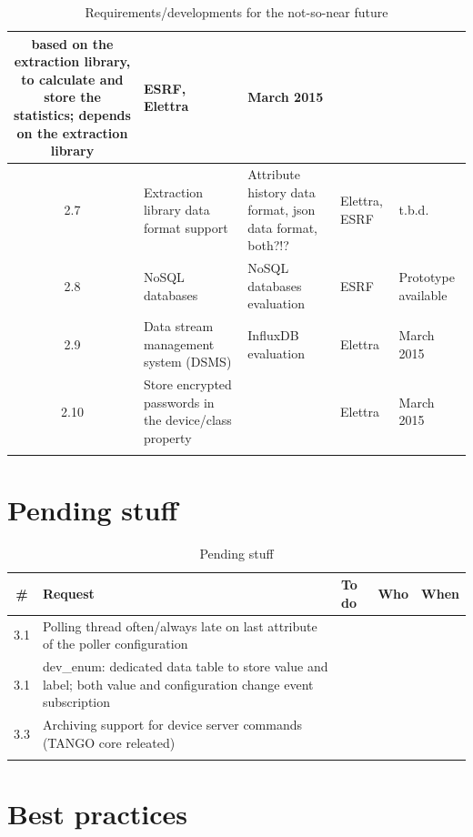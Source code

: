 \documentclass[11pt,a4paper]{article}
\begin{document}
\begin{longtable}{|c|p{6.0cm}|p{6.0cm}|p{1.0cm}|p{1.4cm}|}
	based on the extraction library, to calculate and store the
	statistics; depends on the extraction library &
	ESRF, Elettra &
	March 2015 \\
	\hline
	2.7 &
	Extraction library data format support &
	Attribute history data format, json data format, both?!? &
	Elettra, ESRF &
	t.b.d. \\
	\hline
	2.8 &
	NoSQL databases &
	NoSQL databases evaluation &
	ESRF &
	Prototype available \\
	\hline
	2.9 &
	Data stream management system (DSMS) &
	InfluxDB evaluation &
	Elettra &
	March 2015 \\
	\hline
	2.10 &
	Store encrypted passwords in the device/class property &
	&
	Elettra &
	March 2015 \\
	\hline
	\caption{Requirements/developments for the not-so-near future}
	\label{tab:next-but-future}
\end{longtable}

\newpage

\section{Pending stuff}

\begin{longtable}{|c|p{6.0cm}|p{6.0cm}|p{1.0cm}|p{1.4cm}|}
	\hline
	\bf{\#} & \bf{Request} & \bf{To do} & \bf{Who} & \bf{When} \\
	\hline
	\endhead
	3.1 &
	Polling thread often/always late on last attribute of the poller
	configuration &
	&
	&
	\\
	\hline
	3.1 &
	dev\_enum: dedicated data table to store value and label; both value
	and configuration change event subscription &
	&
	&
	\\
	\hline
	3.3 &
	Archiving support for device server commands (TANGO core releated) &
	&
	&
	\\
	\hline
	\caption{Pending stuff}
	\label{tab:pending}
\end{longtable}

\section{Best practices}
\end{document}
